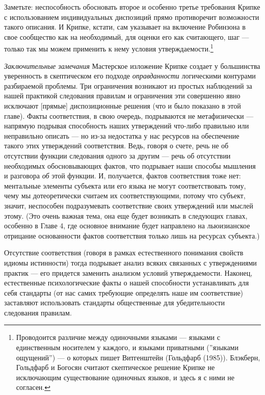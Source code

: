 \documentclass[11pt]{book}
\begin{document}
Заметьте: неспособность обосновать второе и особенно третье требования Крипке с использованием индивидуальных диспозиций прямо противоречит возможности такого описания. И Крипке, кстати, сам указывает на включение Робинзона в свое сообщество как на необходимый, для оценки его как считающего, шаг --- только так мы можем применить к нему условия утверждаемости.\footnote{Проводоится различие между одиночными языками --- языками с единственным носителем у каждого, и языками приватными (''языками ощущений'') --- о которых пишет Витгенштейн (Гольдфарб (1985)). Блэкберн, Гольдфарб и Богосян считают скептическое решение Крипке не исключающим существование одиночных языков, и здесь я с ними не согласен.}

\textit{Заключительные замечания} \quad Мастерское изложение Крипке создает у большинства уверенность в скептическом его подходе \textit{оправданности} логическими контурами разбираемой проблемы. Три ограничения возникают из простых наблюдений за нашей практикой следования правилам и ограничения эти совершенно явно исключают [прямые] диспозиционные решения (что и было показано в этой главе). Факты соответствия, в свою очередь, подрываются не метафизически --- напрямую подрывая способность наших утверждений что-либо правильно или неправильно описать --- но из-за недостатка у нас ресурсов на обеспечение такого этих утверждений соответствия. Ведь, говоря о счете, речь не об отсутствии функции следования одного за другим --- речь об отсутствии необходимых обосновывающих фактов, что подрывает наши способы мышления и разговора \textit{об} этой функции. И, получается, фактов соответствия тоже нет: ментальные элементы субъекта или его языка не могут соответствовать тому, чему мы дотеоретически считаем их соответствующими, потому что субъект, значит, неспособен подразумевать соответствие своих утверждений или мыслей этому. (Это очень важная тема, она еще будет возникать в следующих главах, особенно в Главе 4, где основное внимание будет направлено на льюизианское отрицание основанности фактов соответствия только лишь на ресурсах субъекта.)

Отсутствие соответствия (говоря в рамках естественного понимания свойств идиомы истинности) тогда подрывает анализ всяких связанных с утверждениями практик --- его придется заменить анализом условий утверждаемости. Наконец, естественные психологические факты о нашей способности устанавливать для себя стандарты (от нас самих требующие определять наше им соответствие) заставляют использовать стандарты общественные для убедительности следования правилам.
\end{document}
